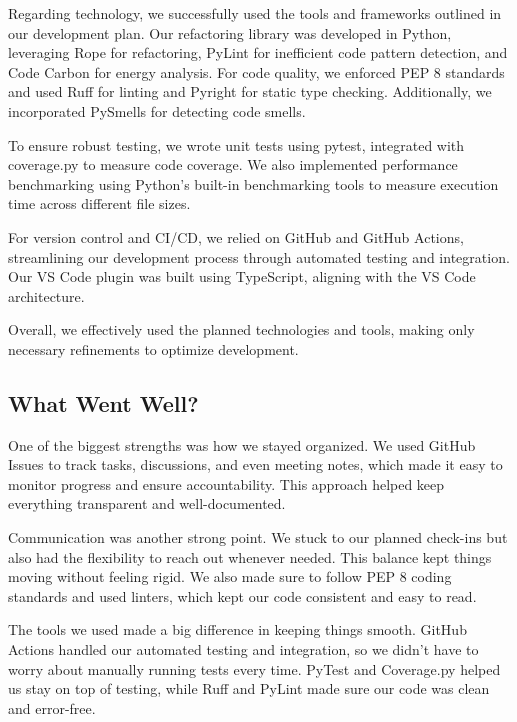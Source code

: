 \documentclass{article}
\begin{document}
Regarding technology, we successfully used the tools and frameworks outlined in our 
development plan. Our refactoring library was developed in Python, leveraging Rope for 
refactoring, PyLint for inefficient code pattern detection, and Code Carbon for energy 
analysis. For code quality, we enforced PEP 8 standards and used Ruff for linting and 
Pyright for static type checking. Additionally, we incorporated PySmells for detecting 
code smells.

To ensure robust testing, we wrote unit tests using pytest, integrated with coverage.py 
to measure code coverage. We also implemented performance benchmarking using Python’s 
built-in benchmarking tools to measure execution time across different file sizes.

For version control and CI/CD, we relied on GitHub and GitHub Actions, streamlining 
our development process through automated testing and integration. Our VS Code plugin 
was built using TypeScript, aligning with the VS Code architecture.

Overall, we effectively used the planned technologies and tools, making only necessary 
refinements to optimize development.

\subsection{What Went Well?}


One of the biggest strengths was how we stayed organized. We used GitHub Issues to track 
tasks, discussions, and even meeting notes, which made it easy to monitor progress and 
ensure accountability. This approach helped keep everything transparent and well-documented.

Communication was another strong point. We stuck to our planned check-ins but also had 
the flexibility to reach out whenever needed. This balance kept things moving without 
feeling rigid. We also made sure to follow PEP 8 coding standards and used linters, 
which kept our code consistent and easy to read.

The tools we used made a big difference in keeping things smooth. GitHub Actions handled 
our automated testing and integration, so we didn’t have to worry about manually running 
tests every time. PyTest and Coverage.py helped us stay on top of testing, while Ruff and 
PyLint made sure our code was clean and error-free.
\end{document}
